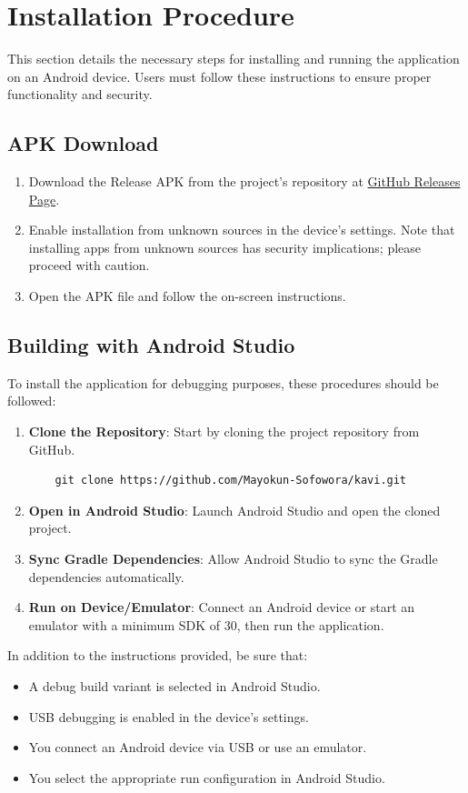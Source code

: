 \section{Installation Procedure}
This section details the necessary steps for installing and running the application on an Android device. Users must follow these instructions to ensure proper functionality and security.

\subsection{APK Download}
\begin{enumerate}
    \item Download the Release APK from the project's repository at \href{https://github.com/Mayokun-Sofowora/kavi/releases/download/v1.0.0/app-release.apk}{GitHub Releases Page}.
    \item Enable installation from unknown sources in the device's settings. Note that installing apps from unknown sources has security implications; please proceed with caution.
    \item Open the APK file and follow the on-screen instructions.
\end{enumerate}

\subsection{Building with Android Studio}
To install the application for debugging purposes, these procedures should be followed:
\begin{enumerate}
    \item \textbf{Clone the Repository}: Start by cloning the project repository from GitHub.
    \begin{verbatim}
    git clone https://github.com/Mayokun-Sofowora/kavi.git
    \end{verbatim}
    \item \textbf{Open in Android Studio}: Launch Android Studio and open the cloned project.
    \item \textbf{Sync Gradle Dependencies}: Allow Android Studio to sync the Gradle dependencies automatically.
    \item \textbf{Run on Device/Emulator}: Connect an Android device or start an emulator with a minimum SDK of 30, then run the application.
\end{enumerate}

In addition to the instructions provided, be sure that:
\begin{itemize}
    \item  A debug build variant is selected in Android Studio.
    \item USB debugging is enabled in the device's settings.
    \item You connect an Android device via USB or use an emulator.
    \item  You select the appropriate run configuration in Android Studio.
\end{itemize}

